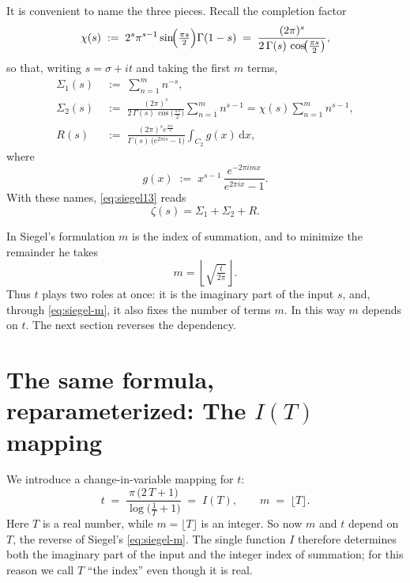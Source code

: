 \documentclass[11pt]{article}
\theoremstyle{definition}
\begin{document}
It is convenient to name the three pieces. Recall the completion factor
\begin{equation}
\chi(s) \;:=\; 2^{s}\pi^{s-1}\sin\!\Bigl(\tfrac{\pi s}{2}\Bigr)\Gamma(1-s)
\;=\;
\frac{(2\pi)^s}{2\,\Gamma(s)\,\cos\!\bigl(\tfrac{\pi s}{2}\bigr)},
\end{equation}
so that, writing $s=\sigma+it$ and taking the first $m$ terms,
\begin{align}
\Sigma_{1}(s) &\;:=\; \sum_{n=1}^{m} n^{-s}, \\[2pt]
\Sigma_{2}(s) &\;:=\; \frac{(2\pi)^s}{2\,\Gamma(s)\,\cos\!\bigl(\tfrac{\pi s}{2}\bigr)}
\sum_{n=1}^{m} n^{s-1}
= \chi(s)\sum_{n=1}^{m} n^{s-1}, \\[2pt]
R(s) &\;:=\; \frac{(2\pi)^s e^{\tfrac{\pi i s}{2}}}{\Gamma(s)\,\bigl(e^{2\pi i s}-1\bigr)}
\int_{C_2} g(x)\,\mathrm{d}x,
\end{align}
where
\begin{equation}
g(x)\;:=\;x^{s-1}\,\frac{e^{-2\pi i m x}}{e^{2\pi i x}-1}.
\end{equation}
With these names, \eqref{eq:siegel13} reads
\begin{equation}\label{eq:siegel-named}
\zeta(s) = \Sigma_{1} + \Sigma_{2} + R.
\end{equation}

In Siegel's formulation $m$ is the index of summation, and to minimize the
remainder he takes
\begin{equation}\label{eq:siegel-m}
m=\left\lfloor\sqrt{\tfrac{t}{2\pi}}\right\rfloor .
\end{equation}
Thus $t$ plays two roles at once: it is the imaginary part of the input $s$,
and, through \eqref{eq:siegel-m}, it also fixes the number of terms $m$. In
this way $m$ depends on $t$. The next section reverses the dependency.

\section{The same formula, reparameterized: The \texorpdfstring{$I(T)$}{I(T)} mapping}\label{sec:IT}

We introduce a change-in-variable mapping for $t$:
\begin{equation}\label{eq:IT}
t
\;=\;
\frac{\pi\,\bigl(2\,T + 1\bigr)}{\log\!\bigl(\tfrac{1}{T} + 1\bigr)}
\;=\; I(T),
\qquad
m \;=\; \lfloor T\rfloor .
\end{equation}
Here $T$ is a real number, while $m=\lfloor T\rfloor$ is an integer. So now
$m$ and $t$ depend on $T$, the reverse of Siegel's \eqref{eq:siegel-m}. The single
function $I$ therefore determines both the imaginary part of the input and the
integer index of summation; for this reason we call $T$ ``the index'' even
though it is real.
\end{document}
